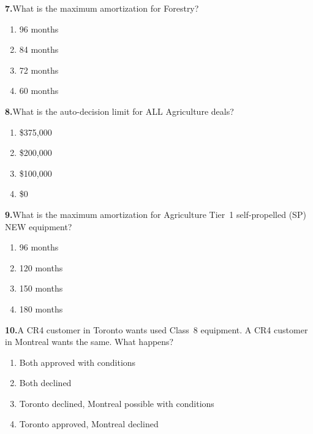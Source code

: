 \documentclass[11pt,letterpaper]{article}
\newif\ifshowsolutions
\newcommand{\answer}[1]{%
  \ifshowsolutions
    \begin{tcolorbox}[colback=green!5!white, colframe=answergreen, title={\small\textbf{Answer}}, fonttitle=\color{white}, coltitle=white, colbacktitle=answergreen, boxrule=0.5pt, arc=2pt, left=4pt, right=4pt, top=2pt, bottom=2pt]
    {\small #1}
    \end{tcolorbox}
  \fi
}
\begin{document}
\vspace{0.5em}

\noindent\textbf{7.}\quad What is the maximum amortization for Forestry?

\begin{enumerate}[label=\Alph*), leftmargin=2em, itemsep=0pt]
\item 96 months
\item 84 months
\item 72 months
\item 60 months
\end{enumerate}
\answer{D) 60 months. One of the most restricted segments: \$0 auto-decision, zero analyst exceptions.}

\vspace{0.5em}

\noindent\textbf{8.}\quad What is the auto-decision limit for ALL Agriculture deals?

\begin{enumerate}[label=\Alph*), leftmargin=2em, itemsep=0pt]
\item \$375,000
\item \$200,000
\item \$100,000
\item \$0
\end{enumerate}
\answer{D) \$0 --- all Agriculture deals are manual. Exception: tractors follow Construction rules.}

\vspace{0.5em}

\noindent\textbf{9.}\quad What is the maximum amortization for Agriculture Tier~1 self-propelled (SP) NEW equipment?

\begin{enumerate}[label=\Alph*), leftmargin=2em, itemsep=0pt]
\item 96 months
\item 120 months
\item 150 months
\item 180 months
\end{enumerate}
\answer{D) 180 months (15 years). The longest amortization in the entire RAC.}

\vspace{0.5em}

\noindent\textbf{10.}\quad A CR4 customer in Toronto wants used Class~8 equipment. A CR4 customer in Montreal wants the same. What happens?

\begin{enumerate}[label=\Alph*), leftmargin=2em, itemsep=0pt]
\item Both approved with conditions
\item Both declined
\item Toronto declined, Montreal possible with conditions
\item Toronto approved, Montreal declined
\end{enumerate}
\answer{C) Toronto (Ontario/West) = NOT ELIGIBLE. Montreal (Quebec/Maritimes) = allowed with 3-year countback, 10--15\% down, verified homeowner, 5-year TIB.}
\end{document}
